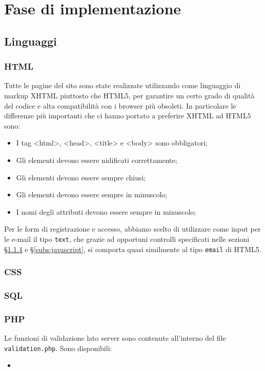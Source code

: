 \section{Fase di implementazione}
\label{sec:fase_di_implementazione}
\subsection{Linguaggi}
\subsubsection{HTML}
Tutte le pagine del sito sono state realizzate utilizzando come linguaggio di markup XHTML piuttosto che HTML5, per garantire un certo grado di qualità del codice e alta compatibilità con i browser più obsoleti. In particolare le differenze più importanti che ci hanno portato a preferire XHTML ad HTML5 sono:
\begin{itemize}
	\item I tag <html>, <head>, <title> e <body> sono obbligatori;
	\item Gli elementi devono essere nidificati correttamente;
	\item Gli elementi devono essere sempre chiusi;
	\item Gli elementi devono essere sempre in minuscolo;
	\item I nomi degli attributi devono essere sempre in minuscolo;
\end{itemize}
Per le form di registrazione e accesso, abbiamo scelto di utilizzare come input per le e-mail il tipo \texttt{text}, che grazie ad opportuni controlli specificati nelle sezioni \S\ref{subs:php} e \S\ref{subs:javascript}, si comporta quasi similmente al tipo \texttt{email} di HTML5. %

\subsubsection{CSS}

\subsubsection{SQL}

\subsubsection{PHP}\label{subs:php}
Le funzioni di validazione lato server sono contenute all'interno del file \texttt{validation.php}. Sono disponibili:
\begin{itemize}
	\item
\end{itemize}

